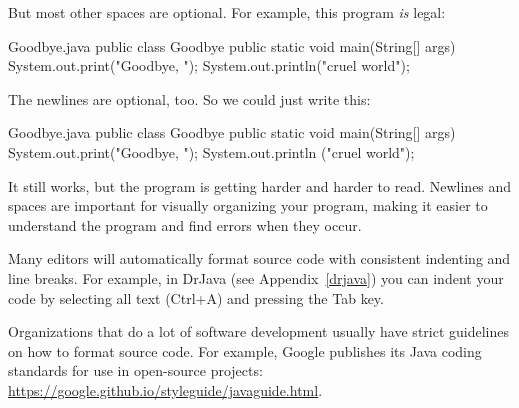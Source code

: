 But most other spaces are optional.
For example, this program {\em is} legal:

\begin{trinket}[220]{Goodbye.java}
public class Goodbye {
public static void main(String[] args) {
System.out.print("Goodbye, ");
System.out.println("cruel world");
}
}
\end{trinket}

The newlines are optional, too.
So we could just write this:

\begin{trinket}[175]{Goodbye.java}
public class Goodbye { public static void main(String[] args)
{ System.out.print("Goodbye, "); System.out.println
("cruel world");}}
\end{trinket}

It still works, but the program is getting harder and harder to read.
Newlines and spaces are important for visually organizing your program, making it easier to understand the program and find errors when they occur.

Many editors will automatically format source code with consistent indenting and line breaks.
For example, in DrJava (see Appendix~\ref{drjava}) you can indent your code by selecting all text ({\sf Ctrl+A}) and pressing the {\sf Tab} key.



%



Organizations that do a lot of software development usually have strict guidelines on how to format source code.
For example, Google publishes its Java coding standards for use in open-source projects: \url{https://google.github.io/styleguide/javaguide.html}.

